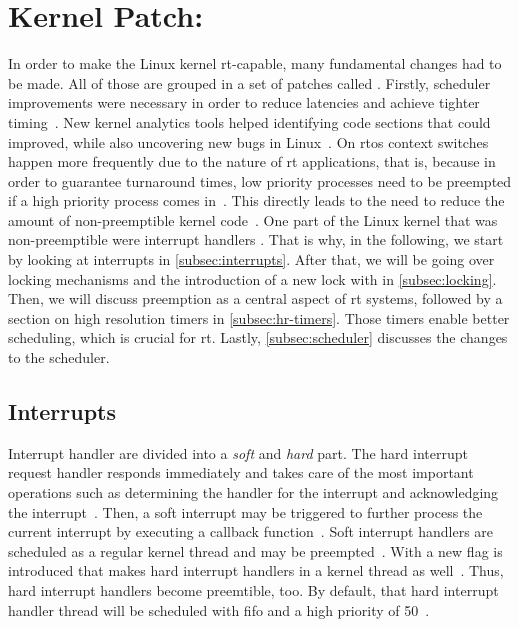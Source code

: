 \documentclass[10pt,twocolumn,a4paper]{article}
\begin{document}
\section{Kernel Patch: }\label{sec:patch}
In order to make the Linux kernel \acrshort{rt}-capable, many fundamental changes had to be made.
All of those are grouped in a set of patches called .
Firstly, scheduler improvements were necessary in order to reduce latencies and achieve tighter timing~\cite{mckenney_realtime_2005}.
New kernel analytics tools helped identifying code sections that could improved, while also uncovering new bugs in Linux~\cite{reghenzani_realtime_2019}.
On \acrshort{rtos} context switches happen more frequently due to the nature of \acrshort{rt} applications, that is, because in order to guarantee turnaround times, low priority processes need to be preempted if a high priority process comes in~\cite{buttazzo_hard_1997}.
This directly leads to the need to reduce the amount of non-preemptible kernel code~\cite{reghenzani_realtime_2019}.
One part of the Linux kernel that was non-preemptible were interrupt handlers \cite{reghenzani_realtime_2019}.
That is why, in the following, we start by looking at interrupts in \autoref{subsec:interrupts}.
After that, we will be going over locking mechanisms and the introduction of a new lock with  in \autoref{subsec:locking}.
Then, we will discuss preemption as a central aspect of \acrshort{rt} systems, followed by a section on high resolution timers in \autoref{subsec:hr-timers}.
Those timers enable better scheduling, which is crucial for \acrshort{rt}.
Lastly, \autoref{subsec:scheduler} discusses the changes to the scheduler.

\subsection{Interrupts}\label{subsec:interrupts}
Interrupt handler are divided into a \emph{soft} and \emph{hard} part.
The hard interrupt request handler responds immediately and takes care of the most important operations such as determining the handler for the interrupt and acknowledging the interrupt~\cite{kernel_labs:interrupts}.
Then, a soft interrupt may be triggered to further process the current interrupt by executing a callback function~\cite{kernel_labs:interrupts}.
Soft interrupt handlers are scheduled as a regular kernel thread and may be preempted~\cite{reghenzani_realtime_2019}.
With  a new flag is introduced that makes hard interrupt handlers in a kernel thread as well~\cite{lf:irq}.
Thus, hard interrupt handlers become preemtible, too.
By default, that hard interrupt handler thread will be scheduled with \acrfull{fifo} and a high priority of 50~\cite{lf:irq}.
\end{document}
